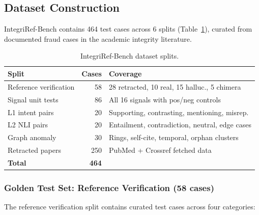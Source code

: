 \documentclass[sigconf,nonacm]{acmart}
\begin{document}
\subsection{Dataset Construction}

IntegriRef-Bench contains 464 test cases across 6 splits (Table~\ref{tab:benchmark_splits}), curated from documented fraud cases in the academic integrity literature.

\begin{table}[t]
\caption{IntegriRef-Bench dataset splits.}
\label{tab:benchmark_splits}
\centering
\small
\begin{tabular}{lrl}
\toprule
\textbf{Split} & \textbf{Cases} & \textbf{Coverage} \\
\midrule
Reference verification & 58 & 28 retracted, 10 real, 15 halluc., 5 chimera \\
Signal unit tests      & 86 & All 16 signals with pos/neg controls \\
L1 intent pairs        & 20 & Supporting, contrasting, mentioning, misrep. \\
L2 NLI pairs           & 20 & Entailment, contradiction, neutral, edge cases \\
Graph anomaly          & 30 & Rings, self-cite, temporal, orphan clusters \\
Retracted papers       & 250 & PubMed + Crossref fetched data \\
\midrule
\textbf{Total}         & \textbf{464} & \\
\bottomrule
\end{tabular}
\end{table}

\subsubsection{Golden Test Set: Reference Verification (58 cases)}

The reference verification split contains curated test cases across four categories:
\end{document}
